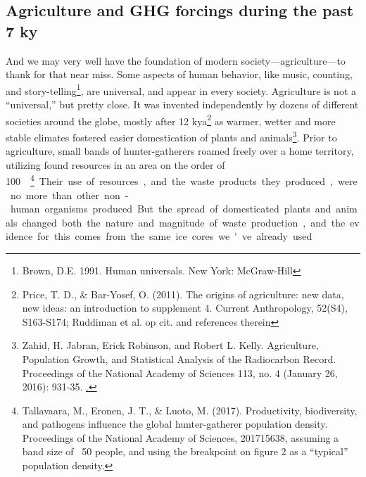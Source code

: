 \subsection{Agriculture and GHG forcings during the past 7 ky}\label{Ag_GHG}
And we may very well have the foundation of modern society---agriculture---to thank for that near miss. Some aspects of human behavior, like music, counting, and story-telling\footnote{Brown, D.E. 1991. Human universals. New York: McGraw-Hill}, are universal, and appear in every society. Agriculture is not a ``universal,'' but pretty close. It was invented independently by dozens of different societies around the globe, mostly after 12 kya\footnote{Price, T. D., \& Bar-Yosef, O. (2011). The origins of agriculture: new data, new ideas: an introduction to supplement 4. Current Anthropology, 52(S4), S163-S174; Ruddiman et al. op cit. and references therein} as warmer, wetter and more stable climates fostered easier domestication of plants and animals\footnote{Zahid, H. Jabran, Erick Robinson, and Robert L. Kelly. Agriculture, Population Growth, and Statistical Analysis of the Radiocarbon Record. Proceedings of the National Academy of Sciences 113, no. 4 (January 26, 2016): 931-35. \href{https://doi.org/10.1073/pnas.1517650112}.}. Prior to agriculture, small bands of hunter-gatherers roamed freely over a home territory, utilizing found resources in an area on the order of \SI{100}{\kilo\metre\square}\footnote{Tallavaara, M., Eronen, J. T., \& Luoto, M. (2017). Productivity, biodiversity, and pathogens influence the global hunter-gatherer population density. Proceedings of the National Academy of Sciences, 201715638, assuming a band size of ~50 people, and using the breakpoint on figure 2 as a ``typical'' population density.}. Their use of resources, and the waste products they produced, were no more than other non-human organisms produced. But the spread of domesticated plants and animals changed both the nature and magnitude of waste production, and the evidence for this comes from the same ice cores we've already used.\\

